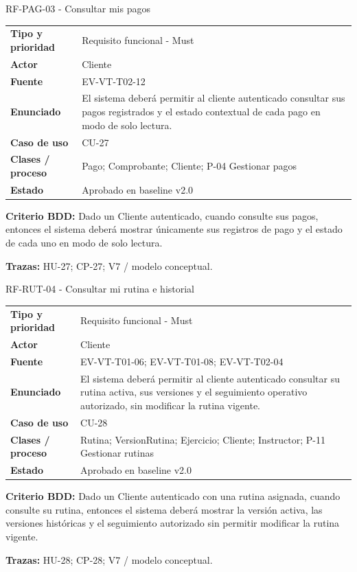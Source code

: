 \begin{reqbox}{RF-PAG-03 - Consultar mis pagos}
\begin{tabularx}{\textwidth}{>{\bfseries}p{3.2cm}Y}
Tipo y prioridad & Requisito funcional - Must \\
Actor & Cliente \\
Fuente & EV-VT-T02-12 \\
Enunciado & El sistema deberá permitir al cliente autenticado consultar sus pagos registrados y el estado contextual de cada pago en modo de solo lectura. \\
Caso de uso & CU-27 \\
Clases / proceso & Pago; Comprobante; Cliente; P-04 Gestionar pagos \\
Estado & Aprobado en baseline v2.0 \\
\end{tabularx}
\textbf{Criterio BDD:} Dado un Cliente autenticado, cuando consulte sus pagos, entonces el sistema deberá mostrar únicamente sus registros de pago y el estado de cada uno en modo de solo lectura.

\textbf{Trazas:} HU-27; CP-27; V7 / modelo conceptual.
\end{reqbox}


\begin{reqbox}{RF-RUT-04 - Consultar mi rutina e historial}
\begin{tabularx}{\textwidth}{>{\bfseries}p{3.2cm}Y}
Tipo y prioridad & Requisito funcional - Must \\
Actor & Cliente \\
Fuente & EV-VT-T01-06; EV-VT-T01-08; EV-VT-T02-04 \\
Enunciado & El sistema deberá permitir al cliente autenticado consultar su rutina activa, sus versiones y el seguimiento operativo autorizado, sin modificar la rutina vigente. \\
Caso de uso & CU-28 \\
Clases / proceso & Rutina; VersionRutina; Ejercicio; Cliente; Instructor; P-11 Gestionar rutinas \\
Estado & Aprobado en baseline v2.0 \\
\end{tabularx}
\textbf{Criterio BDD:} Dado un Cliente autenticado con una rutina asignada, cuando consulte su rutina, entonces el sistema deberá mostrar la versión activa, las versiones históricas y el seguimiento autorizado sin permitir modificar la rutina vigente.

\textbf{Trazas:} HU-28; CP-28; V7 / modelo conceptual.
\end{reqbox}


